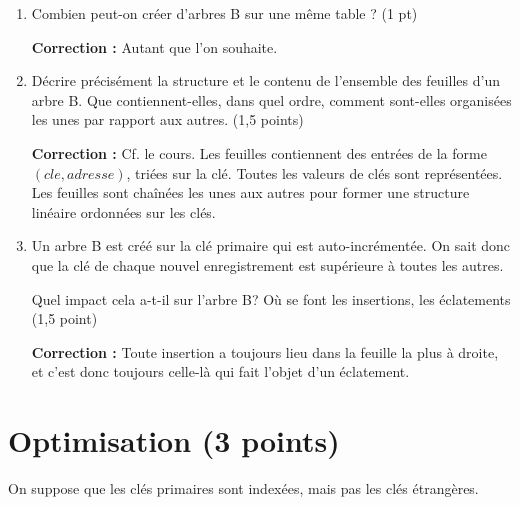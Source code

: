 \documentclass[10pt]{article}
\newenvironment{solution}{\vspace{6pt}\noindent\color{red}\textbf{Correction : }}{\vspace{6pt}\ignorespacesafterend}
\begin{document}
\begin{enumerate}
  \item Combien peut-on créer d'arbres B sur une même table ? (1 pt)
 
\begin{solution}
Autant que l'on souhaite.
\end{solution}

  \item Décrire précisément la structure et le contenu de l'ensemble des feuilles d'un arbre B. Que
     contiennent-elles, dans quel ordre, comment sont-elles organisées les unes par
     rapport aux autres. (1,5 points)

\begin{solution}
      Cf. le cours. Les feuilles contiennent des entrées de la forme $(cle, adresse)$, triées sur la clé.
      Toutes les valeurs de clés sont représentées.
      Les feuilles sont chaînées les unes aux autres pour former une structure linéaire ordonnées sur les clés.

\end{solution}

\item  Un arbre B est créé sur la clé primaire qui est auto-incrémentée. On sait donc
   que la clé de chaque nouvel enregistrement est supérieure à toutes les autres.
   
   Quel impact cela a-t-il sur l'arbre B? Où se font les insertions, les éclatements (1,5 point)

\begin{solution}
Toute insertion a toujours lieu dans la feuille la plus à droite, et c'est donc toujours celle-là qui fait
l'objet d'un éclatement.
\end{solution}

\end{enumerate}


\section{Optimisation (3 points)}

On suppose que les clés primaires sont indexées, mais pas les clés étrangères.
\end{document}
